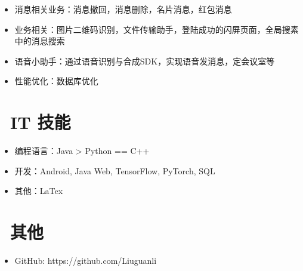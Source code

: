 \documentclass{resume}
\begin{document}
\begin{itemize}
  \item 消息相关业务：消息撤回，消息删除，名片消息，红包消息
 \item 业务相关：图片二维码识别，文件传输助手，登陆成功的闪屏页面，全局搜素中的消息搜索
 \item 语音小助手：通过语音识别与合成SDK，实现语音发消息，定会议室等
 \item 性能优化：数据库优化
\end{itemize}


\section{\faCogs\ IT 技能}
\begin{itemize}[parsep=0.5ex]
  \item 编程语言：Java > Python == C++
  \item 开发：Android, Java Web, TensorFlow, PyTorch, SQL
 \item 其他：LaTex
\end{itemize}


\section{\faInfo\ 其他}
\begin{itemize}[parsep=0.5ex]
  \item GitHub: https://github.com/Liuguanli
\end{itemize}

%
%
\end{document}
